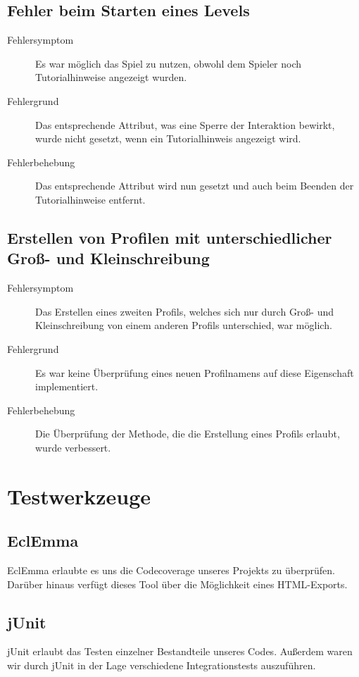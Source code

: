 \documentclass[parskip=full]{scrreprt}
\begin{document}
\section{Fehler beim Starten eines Levels}
\begin{description}
	\item[Fehlersymptom] Es war möglich das Spiel zu nutzen, obwohl dem Spieler noch Tutorialhinweise angezeigt wurden.
	\item[Fehlergrund] Das entsprechende Attribut, was eine Sperre der Interaktion bewirkt, wurde nicht gesetzt, wenn ein Tutorialhinweis angezeigt wird.
	\item[Fehlerbehebung] Das entsprechende Attribut wird nun gesetzt und auch beim Beenden der Tutorialhinweise entfernt.
\end{description}

\section{Erstellen von Profilen mit unterschiedlicher Groß- und Kleinschreibung}
\begin{description}
	\item[Fehlersymptom] Das Erstellen eines zweiten Profils, welches sich nur durch Groß- und Kleinschreibung von einem anderen Profils unterschied, war möglich.
	\item[Fehlergrund] Es war keine Überprüfung eines neuen Profilnamens auf diese Eigenschaft implementiert.
	\item[Fehlerbehebung] Die Überprüfung der Methode, die die Erstellung eines Profils erlaubt, wurde verbessert.
\end{description}

\chapter{Testwerkzeuge}

\section{EclEmma}

EclEmma erlaubte es uns die Codecoverage unseres Projekts zu überprüfen. Darüber hinaus verfügt dieses Tool über die Möglichkeit eines HTML-Exports.

\section{jUnit}

jUnit erlaubt das Testen einzelner Bestandteile unseres Codes. Außerdem waren wir durch jUnit in der Lage verschiedene Integrationstests auszuführen.
\end{document}
